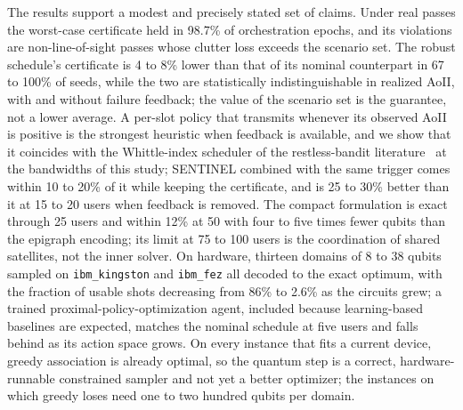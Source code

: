 The results support a modest and precisely stated set of claims. Under real passes the worst-case certificate held in
98.7\% of orchestration epochs, and its violations are non-line-of-sight passes whose clutter loss exceeds the
scenario set. The robust schedule's certificate is 4 to 8\% lower than that of its nominal counterpart in 67 to 100\%
of seeds, while the two are statistically indistinguishable in realized AoII, with and without failure feedback; the
value of the scenario set is the guarantee, not a lower average. A per-slot policy that transmits whenever its
observed AoII is positive is the strongest heuristic when feedback is available, and we show that it coincides with
the Whittle-index scheduler of the restless-bandit literature~\cite{Whittle1988, Kadota2018} at the bandwidths of this
study; SENTINEL combined with the same trigger comes within 10 to 20\% of it while keeping the certificate, and is 25 to
30\% better than it at 15 to 20 users when feedback is removed. The compact formulation is exact through 25 users and
within 12\% at 50 with four to five times fewer qubits than the epigraph encoding; its limit at 75 to 100 users is the
coordination of shared satellites, not the inner solver. On hardware, thirteen domains of 8 to 38 qubits sampled on
\texttt{ibm\_kingston} and \texttt{ibm\_fez} all decoded to the exact optimum, with the fraction of usable shots
decreasing from 86\% to 2.6\% as the circuits grew; a trained proximal-policy-optimization agent, included because
learning-based baselines are expected, matches the nominal schedule at five users and falls behind as its action
space grows. On every instance that fits a current device, greedy association is already optimal, so the quantum step
is a correct, hardware-runnable constrained sampler and not yet a better optimizer; the instances on which greedy
loses need one to two hundred qubits per domain.


